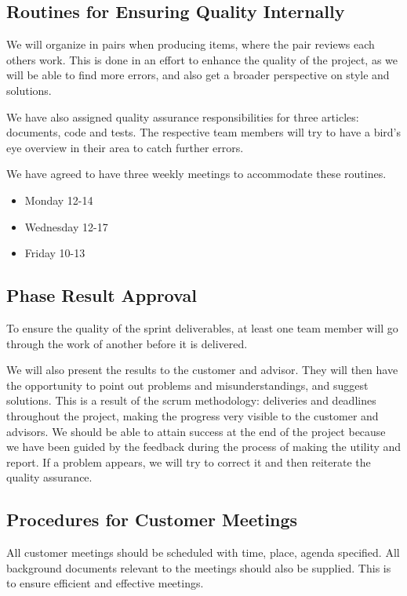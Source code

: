 \subsection{Routines for Ensuring Quality Internally}
We will organize in pairs when producing items, where the pair reviews each others work. This is done in an effort to enhance the quality of the project, as we will be able to find more errors, and 
also get a broader perspective on style and solutions.

We have also assigned quality assurance responsibilities for three articles: documents, code and tests. The respective team members will try to have a bird's eye overview in their area to catch further errors.

We have agreed to have three weekly meetings to accommodate these routines.
\begin{itemize}
	\item Monday 12-14
	\item Wednesday 12-17
	\item Friday 10-13
\end{itemize}

\subsection{Phase Result Approval}
To ensure the quality of the sprint deliverables, at least one team member will go through the work of another before it is delivered.

We will also present the results to the customer and advisor. They will then have the opportunity to point out problems and misunderstandings, and suggest solutions. This is a result of the \Gls{scrum} methodology: deliveries and deadlines throughout the project, making the progress very visible to the customer and advisors. We should be able to attain success at the end of the project because we have been guided by the feedback during the process of making the utility and report. If a problem appears, we will try to correct it and then reiterate the quality assurance.

\subsection{Procedures for Customer Meetings}
All customer meetings should be scheduled with time, place, agenda specified. All background documents relevant to the meetings should also be supplied. This is to ensure efficient and effective meetings.

